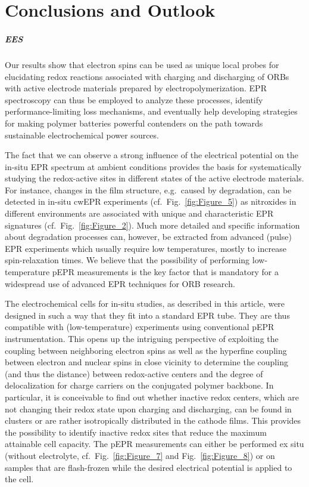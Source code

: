 \chapter{Conclusions and Outlook}

\paragraph{EES}
%
Our results show that electron spins can be used as unique local probes for elucidating redox reactions associated with charging and discharging of ORBs with active electrode materials prepared by electropolymerization. EPR spectroscopy can thus be employed to analyze these processes, identify performance-limiting loss mechanisms, and eventually help developing strategies for making polymer batteries powerful contenders on the path towards sustainable electrochemical power sources. 

\par
The fact that we can observe a strong influence of the electrical potential on the in-situ EPR spectrum at ambient conditions provides the basis for systematically studying the redox-active sites in different states of the active electrode materials. For instance, changes in the film structure, e.g.\ caused by degradation, can be detected in in-situ cwEPR experiments (cf.\ Fig.~\ref{fig:Figure_5}) as nitroxides in different environments are associated with unique and characteristic EPR signatures (cf.\ Fig.~\ref{fig:Figure_2}). Much more detailed and specific information about degradation processes can, however, be extracted from advanced (pulse) EPR experiments which usually require low temperatures, mostly to increase spin-relaxation times. We believe that the possibility of performing low-temperature pEPR measurements is the key factor that is mandatory for a widespread use of advanced EPR techniques for ORB research.

\par
The electrochemical cells for in-situ studies, as described in this article, were designed in such a way that they fit into a standard EPR tube. They are thus compatible with (low-temperature) experiments using conventional pEPR instrumentation. This opens up the intriguing perspective of exploiting the coupling between neighboring electron spins as well as the hyperfine coupling between electron and nuclear spins in close vicinity to determine the coupling (and thus the distance) between redox-active centers and the degree of delocalization for charge carriers on the conjugated polymer backbone. In particular, it is conceivable to find out whether inactive redox centers, which are not changing their redox state upon charging and discharging, can be found in clusters or are rather isotropically distributed in the cathode films. This provides the possibility to identify inactive redox sites that reduce the maximum attainable cell capacity. The pEPR measurements can either be performed ex situ (without electrolyte, cf.\ Fig.~\ref{fig:Figure_7} and Fig.~\ref{fig:Figure_8}) or on samples that are flash-frozen while the desired electrical potential is applied to the cell.

